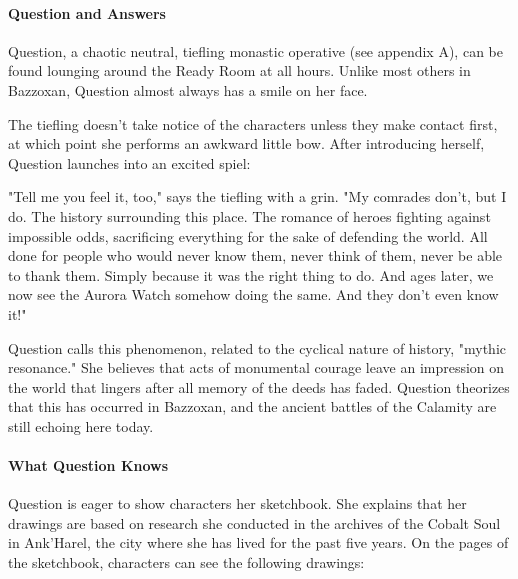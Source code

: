 \documentclass[10pt,a4paper,twoside,twocolumn,openany,nodeprecatedcode]{dndbook}
\begin{document}
\paragraph{Question and Answers}
Question, a chaotic neutral, tiefling monastic operative (see appendix A), can be found lounging around the Ready Room at all hours. Unlike most others in Bazzoxan, Question almost always has a smile on her face.

The tiefling doesn't take notice of the characters unless they make contact first, at which point she performs an awkward little bow. After introducing herself, Question launches into an excited spiel:

\begin{DndReadAloud}{}
"Tell me you feel it, too," says the tiefling with a grin. "My comrades don't, but I do. The history surrounding this place. The romance of heroes fighting against impossible odds, sacrificing everything for the sake of defending the world. All done for people who would never know them, never think of them, never be able to thank them. Simply because it was the right thing to do. And ages later, we now see the Aurora Watch somehow doing the same. And they don't even know it!"

\end{DndReadAloud}

Question calls this phenomenon, related to the cyclical nature of history, "mythic resonance." She believes that acts of monumental courage leave an impression on the world that lingers after all memory of the deeds has faded. Question theorizes that this has occurred in Bazzoxan, and the ancient battles of the Calamity are still echoing here today.

\paragraph{What Question Knows}
Question is eager to show characters her sketchbook. She explains that her drawings are based on research she conducted in the archives of the Cobalt Soul in Ank'Harel, the city where she has lived for the past five years. On the pages of the sketchbook, characters can see the following drawings:
\end{document}
